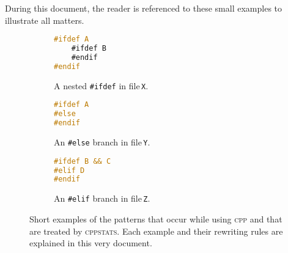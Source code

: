 \documentclass[a4paper]{scrartcl}
\newcommand\code[1]{\texttt{#1}}
\newcommand\tool[1]{\textsc{#1}}
\newcommand\ifdeff[1]{\code{\##1}\xspace}
\newcommand\ifdef[0]{{\upshape\ifdeff{ifdef}}\xspace}
\newcommand\cppstats[0]{\tool{cppstats}\xspace}
\newcommand\cpp{\tool{cpp}\xspace}
\begin{document}
During this document, the reader is referenced to these small examples to illustrate all matters.

\begin{figure}[ht]
        \centering
        \begin{subfigure}[b]{0.3\textwidth}
					\begin{lstlisting}[language=C]
#ifdef A
	#ifdef B
	#endif
#endif
					\end{lstlisting}
					\caption{A nested \ifdef in file\,\code{X}.}
        \end{subfigure}
        \hfill
        \begin{subfigure}[b]{0.3\textwidth}
					\begin{lstlisting}[language=C, firstnumber=5]
#ifdef A
#else 
#endif
					\end{lstlisting}
					\caption{An \ifdeff{else} branch in file\,\code{Y}.}
        \end{subfigure}
				\hfill
        \begin{subfigure}[b]{0.3\textwidth}
					\begin{lstlisting}[language=C, firstnumber=8]
#ifdef B && C
#elif D
#endif
					\end{lstlisting}
					\caption{An \ifdeff{elif} branch in file\,\code{Z}.}
        \end{subfigure}     
        
        \caption{Short examples of the patterns that occur while using \cpp and that are treated by \cppstats. 
        	Each example and their rewriting rules are explained in this very document.}
        \label{fig:examples}
\end{figure}   

%
%
%
%
%
%
%
%
%
%
%
%
%




%
%
\end{document}
